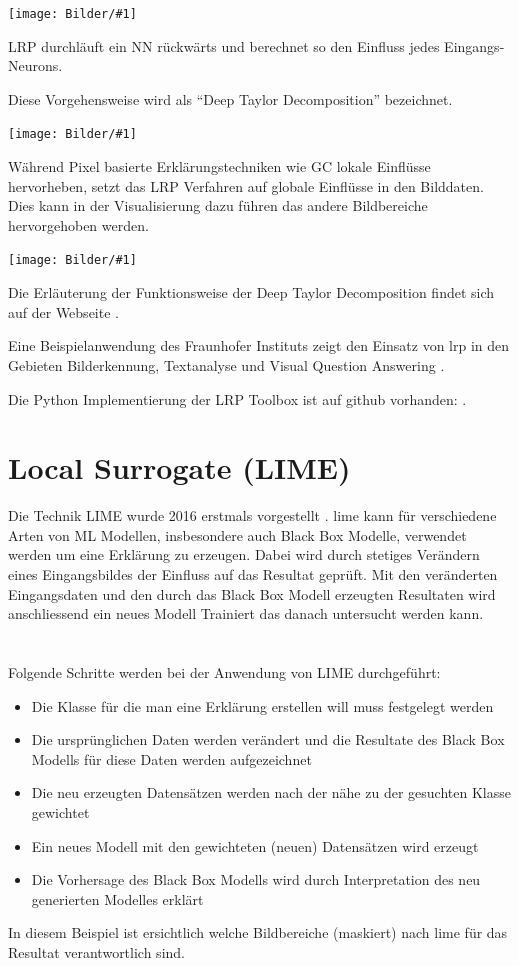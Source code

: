 \documentclass[
  12pt, %
  a4paper, %
  oneside, %
  openany, 
  numbers=noenddot, %
  BCOR=5mm, %
  parskip=half*, %
  thesis, %
]{bfhbook}
\newcommand{\parag}[1]{\paragraph*{#1}\mbox{}\\}
\newcommand{\imgTextQuelle}[4]{
\begin{center}
    \begin{minipage}[t]{0.6\textwidth}
    		\vspace{0pt}
		\texttt{[image: Bilder/\#1]}
		\caption{#2}
		\caption*{Quelle: #3}
	\end{minipage}\hfill
    \begin{minipage}[t]{0.4\textwidth}
    		\vspace{5pt}
    		\begin{FlushRight}
  		#4
  		\end{FlushRight}
    \end{minipage}
\end{center}
}
\newcommand{\fullImgQuelle}[3]{
\begin{center}
  \begin{minipage}{\linewidth}
    \centering
    \texttt{[image: Bilder/\#1]}
    \caption{#2}
    \caption*{Quelle: #3}
  \end{minipage}
\end{center}
}
\begin{document}
\imgTextQuelle{lrpgraph.PNG}{LRP Berechnung}{www.heatmapping.org}{LRP durchläuft ein \gls{NN} rückwärts und berechnet so den Einfluss jedes Eingangs-Neurons.

 Diese Vorgehensweise wird als ``Deep Taylor Decomposition'' bezeichnet.
 }
 
\fullImgQuelle{lrp-classification-example-cat.PNG}{Pixel basierte Relevanz}{Bach \parencite{Bach2015}}
 Während Pixel basierte Erklärungstechniken wie \Gls{GC} lokale Einflüsse hervorheben, setzt das LRP Verfahren auf globale Einflüsse in den Bilddaten. Dies kann in der Visualisierung dazu führen das andere Bildbereiche hervorgehoben werden.
\fullImgQuelle{lrp-example-cat.PNG}{Vergleich Pixel-wise und LRP }{Bach \parencite{Bach2015}}

Die  Erläuterung der Funktionsweise der Deep Taylor Decomposition findet sich auf der Webseite \parencite{deepTaylor}.

 Eine Beispielanwendung des Fraunhofer Instituts zeigt den Einsatz von \acrshort{lrp} in den Gebieten Bilderkennung, Textanalyse und Visual Question Answering \parencite{xaidemos}.

Die Python Implementierung der LRP Toolbox \parencite{JMLR:v17:15-618} ist auf github vorhanden: \parencite{lrpToolbox}.

\section{Local Surrogate (LIME)}
\label{lime}
Die Technik LIME wurde 2016 erstmals vorgestellt \parencite{Ribeiro2016}. 
\Gls{lime} kann für verschiedene Arten von  \Gls{ML} Modellen, insbesondere auch Black Box Modelle, verwendet werden um eine Erklärung zu erzeugen. Dabei wird durch stetiges Verändern eines Eingangsbildes der Einfluss auf das Resultat geprüft. Mit den veränderten Eingangsdaten und den durch das Black Box Modell erzeugten Resultaten wird anschliessend ein neues Modell Trainiert das danach untersucht werden kann.

\parag{}
Folgende Schritte werden bei der Anwendung von LIME durchgeführt:
\begin{itemize}
	\item Die Klasse für die man eine Erklärung erstellen will muss festgelegt werden
	\item Die ursprünglichen Daten werden verändert und die Resultate des Black Box Modells für diese Daten werden aufgezeichnet
	\item Die neu erzeugten Datensätzen werden nach der nähe zu der gesuchten Klasse gewichtet
	\item Ein neues Modell mit den gewichteten (neuen) Datensätzen wird erzeugt
	\item Die Vorhersage des Black Box Modells wird durch Interpretation des neu generierten Modelles erklärt
\end{itemize}
\break
In diesem Beispiel ist ersichtlich welche Bildbereiche (maskiert) nach \gls{lime} für das Resultat verantwortlich sind.
\end{document}
